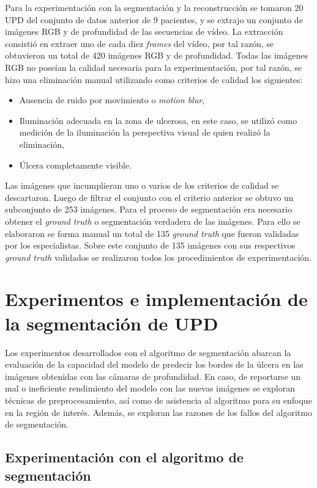 Para la experimentación con la segmentación y la reconstrucción se tomaron 20 UPD del conjunto de datos anterior de 9 pacientes, y se extrajo un conjunto de imágenes RGB y de profundidad de las secuencias de vídeo. La extracción consistió en extraer uno de cada diez \textit{frames} del vídeo, por tal razón, se obtuvieron un total de 420 imágenes RGB y de profundidad. Todas las imágenes RGB no poseían la calidad necesaria para la experimentación, por tal razón, se hizo una eliminación manual utilizando como criterios de calidad los siguientes:
\begin{itemize}
	\item Ausencia de ruido por movimiento o \textit{motion blur},
	\item Iluminación adecuada en la zona de ulcerosa, en este caso, se utilizó como medición de la iluminación la perspectiva visual de quien realizó la eliminación, 
	\item Úlcera completamente visible. 
\end{itemize}
Las imágenes que incumplieran uno o varios de los criterios de calidad se descartaron. Luego de filtrar el conjunto con el criterio anterior se obtuvo un subconjunto de 253 imágenes. Para el proceso de segmentación era necesario obtener el \textit{ground truth} o segmentación verdadera de las imágenes. Para ello se elaboraron se forma manual un total de 135 \textit{ground truth} que fueron validadas por los especialistas. Sobre este conjunto de 135 imágenes con sus respectivos \textit{ground truth} validados se realizaron todos los procedimientos de experimentación.

\section{Experimentos e implementación de la segmentación de UPD}

Los experimentos desarrollados con el algoritmo de segmentación abarcan la evaluación de la capacidad del modelo de predecir los bordes de la úlcera en las imágenes obtenidas con las cámaras de profundidad. En caso, de reportarse un mal o ineficiente rendimiento del modelo con las nuevas imágenes se exploran técnicas de preprocesamiento, así como de asistencia al algoritmo para su enfoque en la región de interés. Además, se exploran las razones de los fallos del algoritmo de segmentación. 

\subsection{Experimentación con el algoritmo de segmentación}

